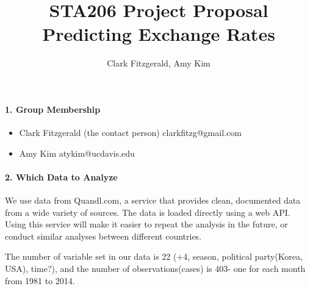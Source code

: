 \documentclass[12pt]{article}
\title{STA206 Project Proposal \\ Predicting Exchange Rates}
\author{Clark Fitzgerald, Amy Kim}
\begin{document}
\maketitle
\paragraph{1. Group Membership}
\begin{itemize}
    \item Clark Fitzgerald (the contact person) clarkfitzg@gmail.com
    \item Amy Kim atykim@ucdavis.edu
\end{itemize}

\paragraph{2. Which Data to Analyze}

We use data from Quandl.com, a service that provides clean, documented
data from a wide variety of sources. The data is loaded directly using a
web API.
Using this service will make it easier
to repeat the analysis in the future, or conduct similar analyses between
different countries.

The number of variable set in our data is 22 (+4, season, political
party(Korea, USA), time?), and the number of observations(cases) is 403-
one for each month from 1981 to 2014.
\end{document}
